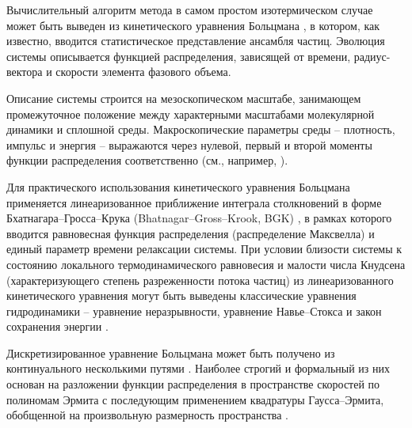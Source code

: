 \documentclass[12pt,a4paper]{article}
\begin{document}
Вычислительный алгоритм метода в самом простом изотермическом случае может быть выведен из кинетического уравнения Больцмана \cite{BOLTZMANN2003, Lifshitz1981}, в котором, как известно, вводится статистическое представление ансамбля частиц.
Эволюция системы описывается функцией распределения, зависящей от времени, радиус-вектора и скорости элемента фазового объема. 

Описание системы строится на мезоскопическом масштабе, занимающем промежуточное положение между характерными масштабами молекулярной динамики и сплошной среды. Макроскопические параметры среды -- плотность, импульс и энергия -- выражаются через нулевой, первый и второй моменты функции распределения соответственно (см., например, \cite{Samarskii2001}).

Для практического использования кинетического уравнения Больцмана применяется линеаризованное приближение интеграла столкновений в форме Бхатнагара--Гросса--Крука (Bhatnagar--Gross--Krook, BGK) \cite{Lifshitz1981, Bhatnagar1954}, в рамках которого вводится равновесная функция распределения (распределение Максвелла) и единый параметр времени релаксации системы. При условии близости системы к состоянию локального термодинамического равновесия и малости числа Кнудсена (характеризующего степень разреженности потока частиц) из линеаризованного кинетического уравнения могут быть выведены классические уравнения гидродинамики -- уравнение неразрывности, уравнение Навье–Стокса и закон сохранения энергии \cite{Qian1992, Succi2018, Redeman2014, Samarskii2001, Lifshitz1981}.


Дискретизированное уравнение Больцмана может быть получено из континуального несколькими путями \cite{Succi2018}. Наиболее строгий и формальный из них основан на разложении функции распределения в пространстве скоростей по полиномам Эрмита с последующим применением квадратуры Гаусса–Эрмита, обобщенной на произвольную размерность пространства \cite{Succi2018, Redeman2014, Krger2017}.
\end{document}
